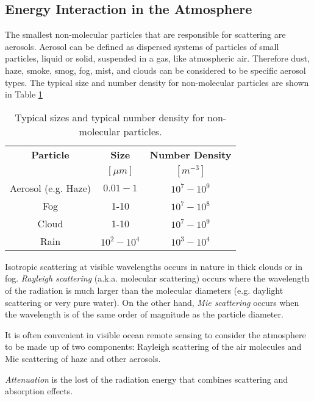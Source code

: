 \subsection{ Energy Interaction in the Atmosphere }

The smallest non-molecular particles that are responsible for scattering are aerosols. Aerosol can be defined as dispersed systems of particles of small particles, liquid or solid, suspended in a gas, like atmospheric air. Therefore dust, haze, smoke, smog, fog, mist, and clouds can be considered to be specific aerosol types. The typical size and number density for non-molecular particles are shown in Table \ref{tab:aerosol_size}

\begin{table}[h!]
\caption{ Typical sizes and typical number density for non-molecular particles. \label{tab:aerosol_size} } 
\centering
\begin{tabular}{c|c|c}
        	\bfseries{Particle}  	& \bfseries{Size}  & \bfseries{Number Density} \\ 
	& $[\mu m]$  		& $[m^{-3}]$ 			\\ \hline \hline
		Aerosol (e.g. Haze)	& $0.01-1$ 	& 	$10^7-10^9$		\\
		Fog			& 1-10		&	$10^7-10^8$		\\
		Cloud			& 1-10		&	$10^7-10^9$		\\
		Rain		& $10^2-10^4$		&	$10^3-10^4$		\\   
 \end{tabular}
\end{table}



Isotropic scattering at visible wavelengths occurs in nature in thick clouds or in fog. {\it Rayleigh scattering}   (a.k.a. molecular scattering) occurs where the wavelength of the radiation is much larger than the molecular diameters (e.g. daylight scattering or very pure water). On the other hand, {\it Mie scattering} occurs when the wavelength is of the same order of magnitude as the particle diameter. 

It is often convenient in visible ocean remote sensing to consider the atmosphere to be made up of two components: Rayleigh scattering of the air molecules and Mie scattering of haze and other aerosols. 

{\it Attenuation} is the lost of the radiation energy that combines scattering and absorption effects.

